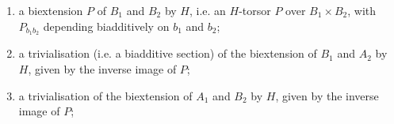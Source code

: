     
 \begin{enumerate}
      
 \item[(a)]
        a biextension \(P\) of \(B_1\) and \(B_2\) by \(H\), i.e. an \(H\)-torsor \(P\) over \(B_1\times  B_2\), with \(P_{b_1b_2}\) depending biadditively on \(b_1\) and \(b_2\);
      


      
 \item[(b)]
        a trivialisation (i.e. a biadditive section) of the biextension of \(B_1\) and \(A_2\) by \(H\), given by the inverse image of \(P\);
      


      
 \item[(c)]
        a trivialisation of the biextension of \(A_1\) and \(B_2\) by \(H\), given by the inverse image of \(P\);
      

    \end{enumerate}


